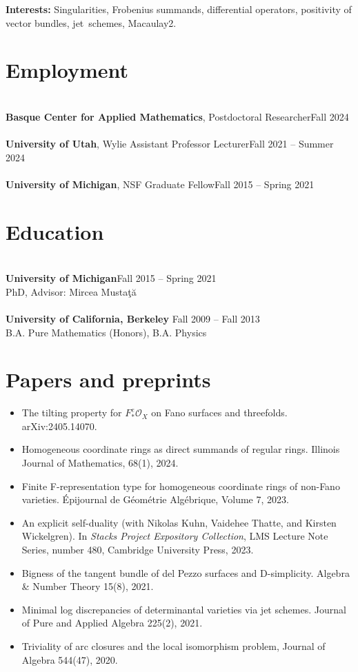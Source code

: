 \documentclass{res}
\begin{document}
\renewcommand\sectionfont{\large \sc}
\begin{resume}
{\bf Interests:} Singularities, Frobenius summands, differential operators, positivity of vector bundles, jet~schemes, Macaulay2.

\section{Employment} 
\ \\
{\bf Basque Center for Applied Mathematics}, Postdoctoral Researcher\hfill Fall 2024
\\\\
{\bf University of Utah}, Wylie Assistant Professor Lecturer\hfill Fall 2021 -- Summer 2024
\\\\
{\bf University of Michigan}, NSF Graduate Fellow\hfill Fall 2015 -- Spring 2021
\section{Education} 
\ \\
{\bf University of Michigan}\hfill Fall 2015 -- Spring 2021
\\ PhD, Advisor: Mircea Musta\c{t}\u{a}
\\
\\
{\bf University of California, Berkeley} \hfill Fall 2009 -- Fall 2013\\B.A. Pure Mathematics (Honors),  B.A. Physics 



\section{Papers and preprints} 
%
\begin{itemize}
\item The tilting property for $F_*^e\mathcal O_X$ on Fano surfaces and threefolds.  arXiv:2405.14070.
\item Homogeneous coordinate rings as direct summands of regular rings.  Illinois Journal of Mathematics, 68(1), 2024.
\item Finite F-representation type for homogeneous coordinate rings of non-Fano varieties.  \'Epijournal de G\'eom\'etrie Alg\'ebrique, Volume 7, 2023.
\item An explicit self-duality (with Nikolas Kuhn, Vaidehee Thatte, and Kirsten Wickelgren). In \emph{Stacks Project Expository Collection}, LMS Lecture Note Series, number 480, Cambridge University Press, 2023.
\item Bigness of the tangent bundle of del Pezzo surfaces and D-simplicity. Algebra \& Number Theory 15(8), 2021.
\item
Minimal log discrepancies of determinantal varieties via jet schemes. Journal of Pure and Applied Algebra 225(2), 2021.
\item
Triviality of arc closures and the local isomorphism problem, Journal of Algebra 544(47), 2020.
\end{itemize}


\end{resume}
\end{document}
